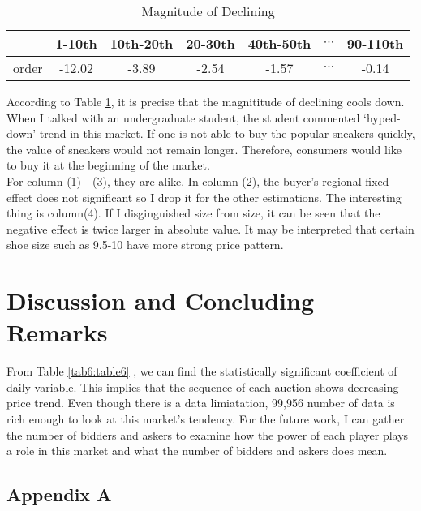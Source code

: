 \documentclass[a4paper]{article}
\theoremstyle{definition}
\theoremstyle{definition}
\theoremstyle{remark}
\begin{document}
\begin{large}
\begin{table}[H]
	\centering
	\caption{Magnitude of Declining}
	\begin{tabular}{c|cccccc}
		\hline\hline
		& 1-10th & 10th-20th & 20-30th & 40th-50th & $ \cdots$ & 90-110th \\\hline
		order & -12.02  & -3.89  & -2.54 & -1.57 & $ \cdots$& -0.14   \\
		\hline\hline
	\end{tabular}
	\label{tab7;table7}
\end{table}

According to Table \ref{tab7;table7}, it is precise that the magnititude of declining cools down. When I talked with an undergraduate student, the student commented `hyped-down' trend in this market. If one is not able to buy the popular sneakers quickly, the value of sneakers would not remain longer. Therefore, consumers would like to buy it at the beginning of the market. \\
For column (1) - (3), they are alike. In column (2), the buyer's regional fixed effect does not significant so I drop it for the other estimations. The interesting thing is column(4). If I disginguished size from size, it can be seen that the negative effect is twice larger in absolute value. It may be interpreted that certain shoe size such as 9.5-10 have more strong price pattern. 

\vspace{1cm}


\section{Discussion and Concluding Remarks}


From Table \ref{tab6:table6} , we can find the statistically significant coefficient of daily variable. This implies that the sequence of each auction shows decreasing price trend. Even though there is a data limiatation, 99,956 number of data is rich enough to look at this market's tendency. For the future work, I can gather the number of bidders and askers to examine how the power of each player plays a role in this market and what the number of bidders and askers does mean.

\newpage

\printbibliography

\newpage
\begin{appendices}
	\section*{Appendix A}
	

\end{appendices}
\end{large}
\end{document}
